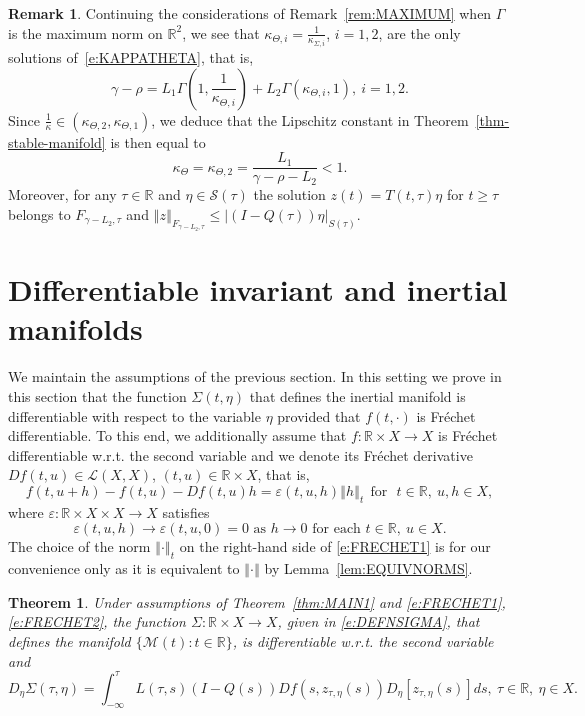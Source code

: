 \documentclass[a4paper,11pt,reqno]{amsart}
\theoremstyle{plain}
\newtheorem{thm}[lem]{Theorem}
\theoremstyle{definition}
\newtheorem{rem}[lem]{Remark}
\numberwithin{equation}{section}
\newcommand{\R}{\mathbb{R}}
\newcommand{\calm}{\mathcal M}
\newcommand{\cals}{\mathcal S}
\newcommand{\norm}[1]{\left\Vert#1\right\Vert}
\newcommand{\eps}{\varepsilon}
\renewcommand{\geq}{\geqslant}
\renewcommand{\leq}{\leqslant}
\begin{document}
\begin{rem}
Continuing the considerations of Remark~\ref{rem:MAXIMUM} when $\Gamma$ is the maximum norm on $\R^2$, we see that
$\kappa_{\Theta,i}=\frac{1}{\kappa_{\Sigma,i}}$, $i=1,2$, are the only solutions of~\eqref{e:KAPPATHETA}, that is,
\begin{equation*}
\gamma-\rho=L_1\Gamma\left(1,\frac{1}{\kappa_{\Theta,i}}\right)+L_2\Gamma\left(\kappa_{\Theta,i},1\right),\ i=1,2.
\end{equation*}
Since $\frac{1}{\kappa}\in(\kappa_{\Theta,2},\kappa_{\Theta,1})$, we deduce that 
the Lipschitz constant in Theorem~\ref{thm-stable-manifold} is then equal to 
$$\kappa_\Theta=\kappa_{\Theta,2}=\frac{L_1}{\gamma-\rho-L_2}<1.$$
Moreover, for any $\tau\in\R$ and $\eta\in\cals(\tau)$ the solution $z(t)=T(t,\tau)\eta$ for $t\geq\tau$ belongs to $F_{\gamma-L_2,\tau}$ and $\norm{z}_{F_{\gamma-L_2,\tau}}\leq|(I-Q(\tau))\eta|_{S(\tau)}$.
\end{rem}

\section{Differentiable invariant and inertial manifolds}\label{sec:diff}

We maintain the assumptions of the previous section. In this setting we prove in this section that the function $\Sigma(t,\eta)$ that defines the inertial manifold  is differentiable with respect to the variable $\eta$ provided that $f(t,\cdot)$ is Fr\'echet differentiable.
To this end, we additionally assume that $f\colon\R\times X\to X$ is Fr\'echet differentiable w.r.t. the second variable and we denote its Fr\'echet derivative $Df(t,u)\in\mathcal{L}(X,X)$, $(t,u)\in\R\times X$, that is,
\begin{equation}\label{e:FRECHET1}
	f(t,u+h)-f(t,u)-Df(t,u)h=\eps(t,u,h)\norm{h}_t\ \ \text{for}\ \ \ t\in\R,\ u,h\in X,
\end{equation}
where $\eps\colon\R\times X\times X\to X$ satisfies
\begin{equation}\label{e:FRECHET2}
	\eps(t,u,h)\to\eps(t,u,0)=0\text{ as }h\to 0\text{ for each }t\in\R,\ u\in X.
\end{equation}
The choice of the norm $\norm{\cdot}_t$ on the right-hand side of \eqref{e:FRECHET1} is for our convenience only as it is equivalent to $\norm{\cdot}$ by Lemma~\ref{lem:EQUIVNORMS}. 

\begin{thm}\label{thm:MAIN2}
Under assumptions of Theorem~\ref{thm:MAIN1} and \eqref{e:FRECHET1}, \eqref{e:FRECHET2}, the function $\Sigma\colon\R\times X\to X$, given in \eqref{e:DEFNSIGMA}, that defines the manifold $\{\calm(t)\colon t\in\R\}$, is differentiable w.r.t. the second variable and
\begin{equation}\label{e:DERSIGMA}
D_\eta\Sigma(\tau,\eta)=\int_{-\infty}^\tau L(\tau,s)(I-Q(s))Df(s,z_{\tau,\eta}(s))D_\eta[z_{\tau,\eta}(s)]ds,\ \tau\in\R,\ \eta\in X.
\end{equation}
\end{thm}
\end{document}
